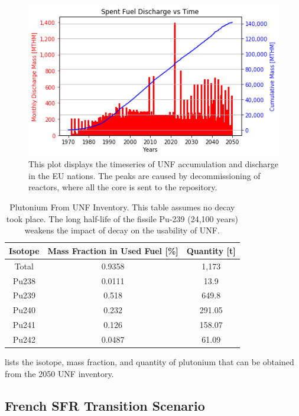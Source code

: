 \begin{figure}[htbp!]
	\begin{center}
			\includegraphics[scale=0.7]{./images/eu_future/snf_discharge.png}
	\end{center}
	\caption{This plot displays the timeseries of \gls{UNF} accumulation and discharge in the \gls{EU} nations.
			 The peaks are caused by decommissioning of reactors, where all the core is sent to the repository.}
	\label{fig:eu_snf}
\end{figure}
\FloatBarrier


\begin{table}[h]
	\centering
	\begin{tabular}{ccc}
		\hline
		\textbf{Isotope} & \textbf{Mass Fraction in Used Fuel [\%]} & \textbf{Quantity [t]} \\ \hline
		Total & 0.9358 & 1,173 \\ \hline
		Pu238 & 0.0111 & 13.9 \\ 
		Pu239 & 0.518 & 649.8 \\ 
		Pu240 & 0.232 & 291.05 \\ 
		Pu241 & 0.126 & 158.07 \\ 
		Pu242 & 0.0487 & 61.09 \\ \hline
	\end{tabular}
	\caption{Plutonium From \gls{UNF} Inventory. This table assumes no decay
			 took place. The long half-life of the fissile Pu-239 (24,100 years)
			 weakens the impact of decay on the usability of \gls{UNF}.}
	\label{tab:pu}
\end{table}


 lists the isotope, mass fraction,
and quantity of plutonium that can be obtained from the 2050 \gls{UNF} inventory.


\subsection{French \gls{SFR} Transition Scenario}

